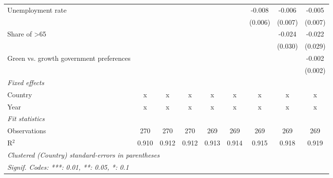 \begin{table}[htbp]
\begin{tabular}{lcccccccc}
      Unemployment rate                                      &         &         &         &         &         & -0.008  & -0.006  & -0.005\\   
                                                             &         &         &         &         &         & (0.006) & (0.007) & (0.007)\\   
      Share of >65                                           &         &         &         &         &         &         & -0.024  & -0.022\\   
                                                             &         &         &         &         &         &         & (0.030) & (0.029)\\   
      Green vs. growth government preferences                &         &         &         &         &         &         &         & -0.002\\   
                                                             &         &         &         &         &         &         &         & (0.002)\\   
      \emph{Fixed effects}\\
      Country                                                & x       & x       & x       & x       & x       & x       & x       & x\\  
      Year                                                   & x       & x       & x       & x       & x       & x       & x       & x\\  
      \midrule \emph{Fit statistics}\\
      Observations                                           & 270     & 270     & 270     & 269     & 269     & 269     & 269     & 269\\  
      R$^2$                                                  & 0.910   & 0.912   & 0.912   & 0.913   & 0.914   & 0.915   & 0.918   & 0.919\\  
      \midrule
      \multicolumn{9}{l}{\emph{Clustered (Country) standard-errors in parentheses}}\\
      \multicolumn{9}{l}{\emph{Signif. Codes: ***: 0.01, **: 0.05, *: 0.1}}\\
   \end{tabular}
\end{table}



